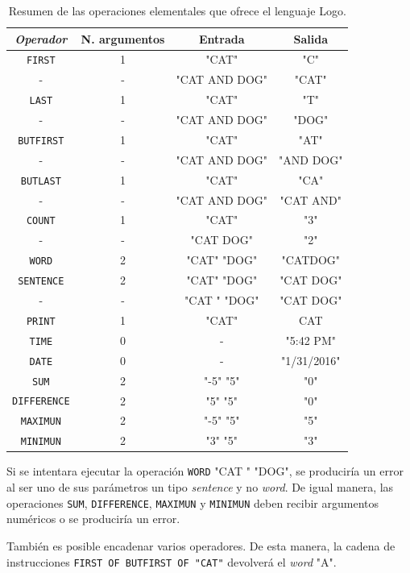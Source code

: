 \begin{table}[!ht]
	\begin{centering}
		\begin{tabular}{c|c|c|c}
\emph{Operador} & N. argumentos & Entrada & Salida\\
\hline
\texttt{FIRST}	& 1 & "CAT" & "C"\\
- & - & "CAT AND DOG" & "CAT"\\
\texttt{LAST} & 1 & "CAT" & "T"\\
- & - & "CAT AND DOG" & "DOG"\\
\texttt{BUTFIRST} &1& "CAT" & "AT"\\
- & - & "CAT AND DOG" & "AND DOG"\\
\texttt{BUTLAST} & 1 & "CAT" & "CA"\\
- & - & "CAT AND DOG" & "CAT AND"\\
\texttt{COUNT} & 1 & "CAT" & "3"\\
- & - & "CAT DOG" & "2"\\
\texttt{WORD}& 2 & "CAT" "DOG" & "CATDOG"\\
\texttt{SENTENCE}& 2 & "CAT" "DOG" & "CAT DOG"\\
- & - & "CAT " "DOG" & "CAT DOG"\\
\texttt{PRINT} & 1 & "CAT" & CAT\\
\texttt{TIME} & 0 & - & "5:42 PM"\\
\texttt{DATE} & 0 & - & "1/31/2016"\\
\texttt{SUM} & 2 & "-5" "5" & "0"\\
\texttt{DIFFERENCE} & 2 & "5" "5"& "0"\\
\texttt{MAXIMUN} & 2 & "-5" "5" & "5"\\
\texttt{MINIMUN} & 2 & "3" "5"& "3"\\
\end{tabular}
	\caption{Resumen de las operaciones elementales que ofrece el lenguaje Logo.}
		\label{tab:logo-operaciones}
	\end{centering}
\end{table}

Si se intentara ejecutar la operación \texttt{WORD} "CAT " "DOG", se produciría un error al ser uno de sus parámetros un tipo \emph{sentence} y no \emph{word}. De igual manera, las operaciones \texttt{SUM}, \texttt{DIFFERENCE}, \texttt{MAXIMUN} y \texttt{MINIMUN} deben recibir argumentos numéricos o se produciría un error.

También es posible encadenar varios operadores. De esta manera, la cadena de instrucciones \texttt{FIRST OF BUTFIRST OF "CAT"} devolverá el \emph{word} "A".


